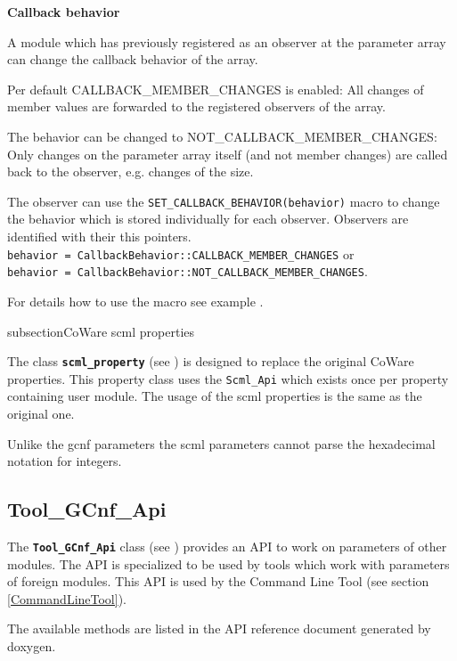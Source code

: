 \noindent
{\bf Callback behavior}

A module which has previously registered as an observer at the parameter array can change the callback behavior of the array.

Per default \textsf{CALLBACK\_MEMBER\_CHANGES} is enabled: All changes of member values are forwarded to the registered observers of the array.

The behavior can be changed to \textsf{NOT\_CALLBACK\_MEMBER\_CHANGES}: Only changes on the parameter array itself (and not member changes) are called back to the observer, e.g. changes of the size.

The observer can use the \lstinline|SET_CALLBACK_BEHAVIOR(behavior)| macro to change the behavior which is stored individually for each observer. Observers are identified with their this pointers. \\
\lstinline|behavior = CallbackBehavior::CALLBACK_MEMBER_CHANGES| or \\
\lstinline|behavior = CallbackBehavior::NOT_CALLBACK_MEMBER_CHANGES|.

For details how to use the macro see example .


subsection{CoWare scml properties}

The class {\bf \lstinline|scml_property|} (see ) is designed to replace the original CoWare properties. This property class uses the \lstinline|Scml_Api| which exists once per property containing user module. The usage of the \GreenConfig scml properties is the same as the original one.

Unlike the gcnf parameters the scml parameters cannot parse the hexadecimal notation for integers.


\subsection{Tool\_GCnf\_Api}

The {\bf \lstinline|Tool_GCnf_Api|} class (see ) provides an API to work on parameters of other modules. The API is specialized to be used by tools which work with parameters of foreign modules. This API is used by the Command Line Tool (see section \ref{CommandLineTool}).

The available methods are listed in the API reference document generated by doxygen.



